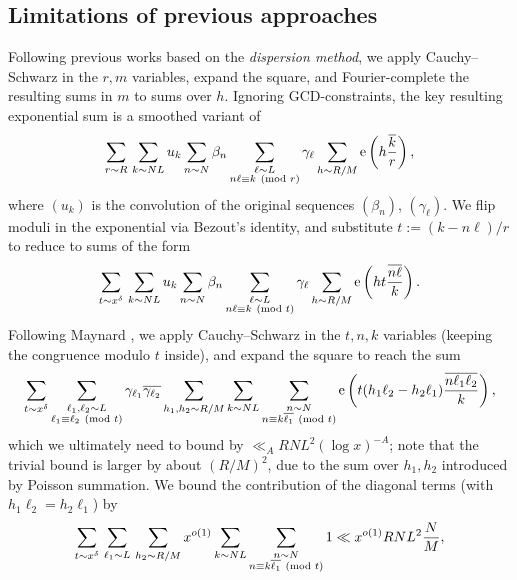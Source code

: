 \documentclass[reqno,11pt]{amsart}
\theoremstyle{definition}
\theoremstyle{remark}
\numberwithin{equation}{section}
\newcommand{\e}{\textnormal{e}}
\renewcommand{\bar}{\overline}
\renewcommand{\pmod}[1]{\ (\textnormal{mod } #1)}
\begin{document}
\subsection{Limitations of previous approaches} \label{subsec:limitations}
Following previous works \cite{bombieri1986primes,drappeau2015theoremes,maynard2020primes} based on the \emph{dispersion method}, we apply Cauchy--Schwarz in the $r, m$ variables, expand the square, and Fourier-complete the resulting sums in $m$ to sums over $h$. Ignoring GCD-constraints, the key resulting exponential sum is a smoothed variant of
\begin{equation} \label{eq:sketch-main-exponential}
    \sum_{r \sim R}\,
    \sum_{k \sim NL} u_k
    \sum_{n \sim N} \beta_n
    \sum_{\substack{\ell \sim L \\ n\ell \equiv k \pmod{r}}} \gamma_\ell
    \sum_{h \sim R/M} \e\left(h \frac{\bar{k}}{r} \right),
\end{equation}
where $(u_k)$ is the convolution of the original sequences $(\beta_n)$, $(\gamma_\ell)$. We flip moduli in the exponential via Bezout's identity, and substitute $t := (k - n\ell)/r$ to reduce to sums of the form
\[
    \sum_{t \sim x^\delta}\,
    \sum_{k \sim NL} u_k
    \sum_{n \sim N} \beta_n
    \sum_{\substack{\ell \sim L \\ n\ell \equiv k \pmod{t}}} \gamma_\ell
    \sum_{h \sim R/M} \e\left(h t \frac{\bar{n\ell}}{k} \right).
\]
Following Maynard \cite{maynard2020primes}, we apply Cauchy--Schwarz in the $t, n, k$ variables (keeping the congruence modulo $t$ inside), and expand the square to reach the sum 
\[
    \sum_{t \sim x^\delta}
    \sum_{\substack{\ell_1, \ell_2 \sim L \\ \ell_1 \equiv \ell_2 \pmod{t}}}
    \gamma_{\ell_1} \bar{\gamma_{\ell_2}}
    \sum_{h_1, h_2 \sim R/M}
    \sum_{k \sim NL}
    \sum_{\substack{n \sim N \\ n \equiv k\bar{\ell_1} \pmod{t}}}
    \e\left(t(h_1 \ell_2 - h_2 \ell_1) \frac{\bar{n\ell_1\ell_2}}{k} \right),
\]
which we ultimately need to bound by $\ll_A RNL^2 (\log x)^{-A}$; note that the trivial bound is larger by about $(R/M)^2$, due to the sum over $h_1, h_2$ introduced by Poisson summation. 
We bound the contribution of the diagonal terms (with $h_1\ell_2 = h_2\ell_1$) by
\begin{equation} \label{eq:sketch-diagonal-terms}
    \sum_{t \sim x^\delta}\,
    \sum_{\ell_1 \sim L}\,
    \sum_{h_2 \sim R/M} x^{o(1)}
    \sum_{k \sim NL} 
    \sum_{\substack{n \sim N \\ n \equiv k\bar{\ell_1} \pmod{t}}} 1
    \ll 
    x^{o(1)} RNL^2 \frac{N}{M},
\end{equation}
\end{document}
